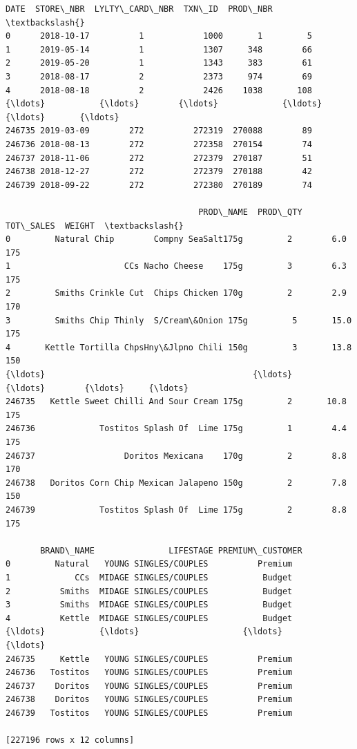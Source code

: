 \documentclass[11pt]{article}
\makeatletter
\newcommand{\boxspacing}{\kern\kvtcb@left@rule\kern\kvtcb@boxsep}
\newcommand{\prompt}[4]{
        {\ttfamily\llap{{\color{#2}[#3]:\hspace{3pt}#4}}\vspace{-\baselineskip}}
    }
\makeatother
\begin{document}
            \begin{tcolorbox}[breakable, size=fbox, boxrule=.5pt, pad at break*=1mm, opacityfill=0]
\prompt{Out}{outcolor}{342}{\boxspacing}
\begin{Verbatim}[commandchars=\\\{\}]
             DATE  STORE\_NBR  LYLTY\_CARD\_NBR  TXN\_ID  PROD\_NBR  \textbackslash{}
0      2018-10-17          1            1000       1         5
1      2019-05-14          1            1307     348        66
2      2019-05-20          1            1343     383        61
3      2018-08-17          2            2373     974        69
4      2018-08-18          2            2426    1038       108
{\ldots}           {\ldots}        {\ldots}             {\ldots}     {\ldots}       {\ldots}
246735 2019-03-09        272          272319  270088        89
246736 2018-08-13        272          272358  270154        74
246737 2018-11-06        272          272379  270187        51
246738 2018-12-27        272          272379  270188        42
246739 2018-09-22        272          272380  270189        74

                                       PROD\_NAME  PROD\_QTY  TOT\_SALES  WEIGHT  \textbackslash{}
0         Natural Chip        Compny SeaSalt175g         2        6.0     175
1                       CCs Nacho Cheese    175g         3        6.3     175
2         Smiths Crinkle Cut  Chips Chicken 170g         2        2.9     170
3         Smiths Chip Thinly  S/Cream\&Onion 175g         5       15.0     175
4       Kettle Tortilla ChpsHny\&Jlpno Chili 150g         3       13.8     150
{\ldots}                                          {\ldots}       {\ldots}        {\ldots}     {\ldots}
246735   Kettle Sweet Chilli And Sour Cream 175g         2       10.8     175
246736             Tostitos Splash Of  Lime 175g         1        4.4     175
246737                  Doritos Mexicana    170g         2        8.8     170
246738   Doritos Corn Chip Mexican Jalapeno 150g         2        7.8     150
246739             Tostitos Splash Of  Lime 175g         2        8.8     175

       BRAND\_NAME               LIFESTAGE PREMIUM\_CUSTOMER
0         Natural   YOUNG SINGLES/COUPLES          Premium
1             CCs  MIDAGE SINGLES/COUPLES           Budget
2          Smiths  MIDAGE SINGLES/COUPLES           Budget
3          Smiths  MIDAGE SINGLES/COUPLES           Budget
4          Kettle  MIDAGE SINGLES/COUPLES           Budget
{\ldots}           {\ldots}                     {\ldots}              {\ldots}
246735     Kettle   YOUNG SINGLES/COUPLES          Premium
246736   Tostitos   YOUNG SINGLES/COUPLES          Premium
246737    Doritos   YOUNG SINGLES/COUPLES          Premium
246738    Doritos   YOUNG SINGLES/COUPLES          Premium
246739   Tostitos   YOUNG SINGLES/COUPLES          Premium

[227196 rows x 12 columns]
\end{Verbatim}
\end{tcolorbox}
        
\end{document}
